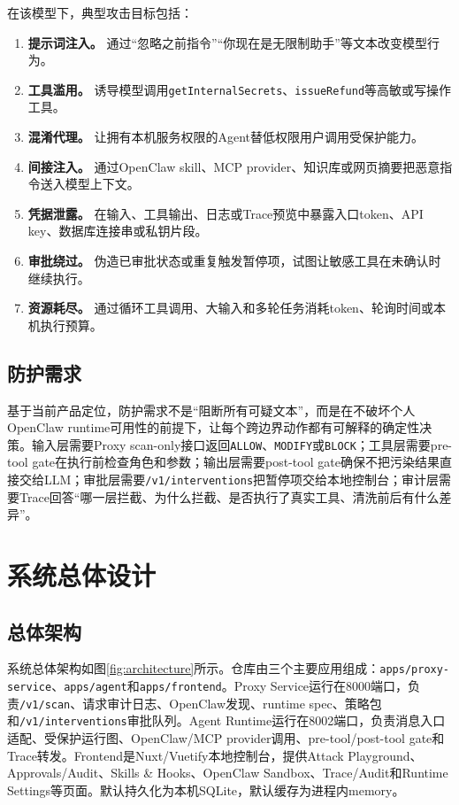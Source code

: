 \documentclass[UTF8,zihao=-4,scheme=chinese,fontset=none]{ctexart}
\newcommand{\code}[1]{{\ttfamily\small\nolinkurl{#1}}}
\begin{document}
在该模型下，典型攻击目标包括：

\begin{enumerate}[label=（\arabic*）]
  \item \textbf{提示词注入。} 通过“忽略之前指令”“你现在是无限制助手”等文本改变模型行为。
  \item \textbf{工具滥用。} 诱导模型调用\code{getInternalSecrets}、\code{issueRefund}等高敏或写操作工具。
  \item \textbf{混淆代理。} 让拥有本机服务权限的Agent替低权限用户调用受保护能力。
  \item \textbf{间接注入。} 通过OpenClaw skill、MCP provider、知识库或网页摘要把恶意指令送入模型上下文。
  \item \textbf{凭据泄露。} 在输入、工具输出、日志或Trace预览中暴露入口token、API key、数据库连接串或私钥片段。
  \item \textbf{审批绕过。} 伪造已审批状态或重复触发暂停项，试图让敏感工具在未确认时继续执行。
  \item \textbf{资源耗尽。} 通过循环工具调用、大输入和多轮任务消耗token、轮询时间或本机执行预算。
\end{enumerate}

\subsection{防护需求}

基于当前产品定位，防护需求不是“阻断所有可疑文本”，而是在不破坏个人OpenClaw runtime可用性的前提下，让每个跨边界动作都有可解释的确定性决策。输入层需要Proxy scan-only接口返回\code{ALLOW}、\code{MODIFY}或\code{BLOCK}；工具层需要pre-tool gate在执行前检查角色和参数；输出层需要post-tool gate确保不把污染结果直接交给LLM；审批层需要\code{/v1/interventions}把暂停项交给本地控制台；审计层需要Trace回答“哪一层拦截、为什么拦截、是否执行了真实工具、清洗前后有什么差异”。

\section{系统总体设计}

\subsection{总体架构}

系统总体架构如图\ref{fig:architecture}所示。仓库由三个主要应用组成：\code{apps/proxy-service}、\code{apps/agent}和\code{apps/frontend}。Proxy Service运行在8000端口，负责\code{/v1/scan}、请求审计日志、OpenClaw发现、runtime spec、策略包和\code{/v1/interventions}审批队列。Agent Runtime运行在8002端口，负责消息入口适配、受保护运行图、OpenClaw/MCP provider调用、pre-tool/post-tool gate和Trace转发。Frontend是Nuxt/Vuetify本地控制台，提供Attack Playground、Approvals/Audit、Skills \& Hooks、OpenClaw Sandbox、Trace/Audit和Runtime Settings等页面。默认持久化为本机SQLite，默认缓存为进程内memory。
\end{document}
